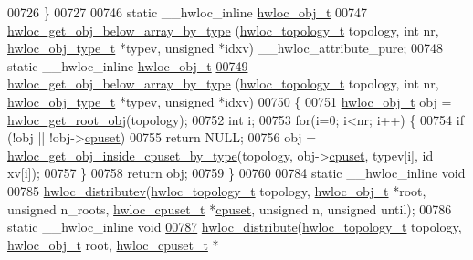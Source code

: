 \begin{DoxyCode}
00726 \}
00727 
00746 \textcolor{keyword}{static} \_\_hwloc\_inline \hyperlink{a00016}{hwloc_obj_t}
00747 \hyperlink{a00058_gac33a0990f4e771b2117ddedabc3f00f6}{hwloc_get_obj_below_array_by_type} (\hyperlink{a00039_ga9d1e76ee15a7dee158b786c30b6a6e38}{hwloc_topology_t} topology, \textcolor{keywordtype}{int} nr, 
      \hyperlink{a00041_gacd37bb612667dc437d66bfb175a8dc55}{hwloc_obj_type_t} *typev, \textcolor{keywordtype}{unsigned} *idxv) \_\_hwloc\_attribute\_pure;
00748 \textcolor{keyword}{static} \_\_hwloc\_inline \hyperlink{a00016}{hwloc_obj_t}
\hypertarget{a00031_source_l00749}{}\hyperlink{a00058_gac33a0990f4e771b2117ddedabc3f00f6}{00749} \hyperlink{a00058_gac33a0990f4e771b2117ddedabc3f00f6}{hwloc_get_obj_below_array_by_type} (\hyperlink{a00039_ga9d1e76ee15a7dee158b786c30b6a6e38}{hwloc_topology_t} topology, \textcolor{keywordtype}{int} nr, 
      \hyperlink{a00041_gacd37bb612667dc437d66bfb175a8dc55}{hwloc_obj_type_t} *typev, \textcolor{keywordtype}{unsigned} *idxv)
00750 \{
00751   \hyperlink{a00016}{hwloc_obj_t} obj = \hyperlink{a00053_gadbf58f6e187efbdb3cd9a8e30311b7d7}{hwloc_get_root_obj}(topology);
00752   \textcolor{keywordtype}{int} i;
00753   \textcolor{keywordflow}{for}(i=0; i<nr; i++) \{
00754     \textcolor{keywordflow}{if} (!obj || !obj->\hyperlink{a00016_a67925e0f2c47f50408fbdb9bddd0790f}{cpuset})
00755       \textcolor{keywordflow}{return} NULL;
00756     obj = \hyperlink{a00054_gaa8dcdb85224f7350b90fb0a1ca91e6d6}{hwloc_get_obj_inside_cpuset_by_type}(topology, obj->\hyperlink{a00016_a67925e0f2c47f50408fbdb9bddd0790f}{cpuset}, typev[i], id
      xv[i]);
00757   \}
00758   \textcolor{keywordflow}{return} obj;
00759 \}
00760 
00784 \textcolor{keyword}{static} \_\_hwloc\_inline \textcolor{keywordtype}{void}
00785 \hyperlink{a00059_gaf057d7c5e3cb3df897ce527258537619}{hwloc_distributev}(\hyperlink{a00039_ga9d1e76ee15a7dee158b786c30b6a6e38}{hwloc_topology_t} topology, \hyperlink{a00016}{hwloc_obj_t} *root, \textcolor{keywordtype}{unsigned} n\_roots,
       \hyperlink{a00040_ga4bbf39b68b6f568fb92739e7c0ea7801}{hwloc_cpuset_t} *\hyperlink{a00016_a67925e0f2c47f50408fbdb9bddd0790f}{cpuset}, \textcolor{keywordtype}{unsigned} n, \textcolor{keywordtype}{unsigned} until);
00786 \textcolor{keyword}{static} \_\_hwloc\_inline \textcolor{keywordtype}{void}
\hypertarget{a00031_source_l00787}{}\hyperlink{a00059_ga6d5c88292ad5aa062c1bebc99369c042}{00787} \hyperlink{a00059_ga6d5c88292ad5aa062c1bebc99369c042}{hwloc_distribute}(\hyperlink{a00039_ga9d1e76ee15a7dee158b786c30b6a6e38}{hwloc_topology_t} topology, \hyperlink{a00016}{hwloc_obj_t} root, \hyperlink{a00040_ga4bbf39b68b6f568fb92739e7c0ea7801}{hwloc_cpuset_t} *

\end{DoxyCode}
